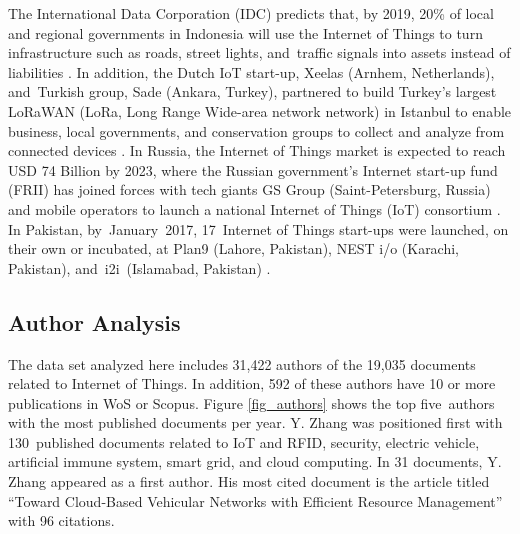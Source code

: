 \documentclass[symmetry,article,accept,moreauthors,pdftex10pt,a4paper]{mdpi}
\begin{document}
The  International Data Corporation (IDC) predicts that, by 2019, 20\% of local and regional governments in Indonesia will use the Internet of Things to turn infrastructure such as roads, street lights, and~traffic signals into assets instead of liabilities \cite{Estopace2017}. In addition, the Dutch IoT start-up, Xeelas (Arnhem, Netherlands), and~Turkish group, Sade (Ankara, Turkey), partnered to build Turkey's largest LoRaWAN (LoRa, Long Range Wide-area network network) in Istanbul to enable business, local governments, and conservation groups to collect and analyze from connected devices \cite{turkey2017}. In Russia, the Internet of Things market is expected to reach USD 74 Billion by 2023, where the Russian government's Internet start-up fund (FRII) has joined forces with tech giants GS Group (Saint-Petersburg, Russia) and mobile operators to launch a national Internet of Things (IoT) consortium \cite{russia2017}. In Pakistan, by~January~2017, 17~Internet of Things start-ups were launched, on their own or incubated, at Plan9 (Lahore, Pakistan), NEST i/o (Karachi, Pakistan), and~i2i~(Islamabad, Pakistan) \cite{ignite2017}.

 


\subsection{Author Analysis}

The data set analyzed here includes 31,422 authors of the 19,035 documents related to Internet of Things. In addition, 592 of these authors have 10 or more publications in WoS or Scopus. Figure \ref{fig_authors} shows the top five~authors with the most published documents per year. Y. Zhang was positioned first with 130~published documents related to IoT and
RFID, security, electric vehicle, artificial immune system, smart grid, and cloud computing. In 31 documents, Y. Zhang appeared as a first author. His most cited document is the article titled ``Toward Cloud-Based Vehicular Networks with Efficient Resource Management'' \cite{ISI:000325658900009} with 96 citations.
\end{document}
